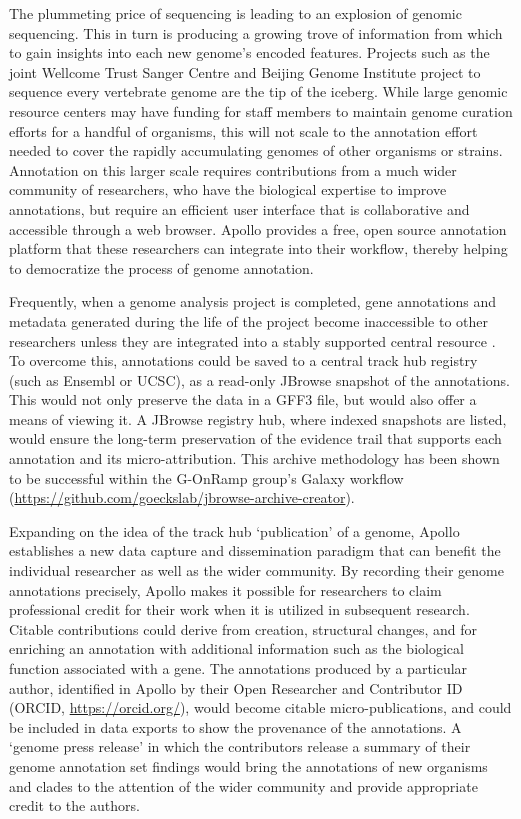 The plummeting price of sequencing is leading to an explosion of genomic
sequencing. This in turn is producing a growing trove of information
from which to gain insights into each new genome's encoded features.
Projects such as the joint Wellcome Trust Sanger Centre and Beijing
Genome Institute project to sequence every vertebrate genome \cite{Pennisi_2018}
are the tip of the iceberg. While large genomic resource centers may
have funding for staff members to maintain genome curation efforts for a
handful of organisms, this will not scale to the annotation effort
needed to cover the rapidly accumulating genomes of other organisms or
strains. Annotation on this larger scale requires contributions from a
much wider community of researchers, who have the biological expertise
to improve annotations, but require an efficient user interface that is
collaborative and accessible through a web browser. Apollo provides a
free, open source annotation platform that these researchers can
integrate into their workflow, thereby helping to democratize the
process of genome annotation.

Frequently, when a genome analysis project is completed, gene
annotations and metadata generated during the life of the project become
inaccessible to other researchers unless they are integrated into a
stably supported central resource \cite{Gibney_2013}. To overcome this,
annotations could be saved to a central track hub registry (such as
Ensembl or UCSC), as a read-only JBrowse snapshot of the annotations.
This would not only preserve the data in a GFF3 file, but would also
offer a means of viewing it. A JBrowse registry hub, where indexed
snapshots are listed, would ensure the long-term preservation of the
evidence trail that supports each annotation and its micro-attribution.
This archive methodology has been shown to be successful within the
G-OnRamp group's Galaxy workflow
(\url{https://github.com/goeckslab/jbrowse-archive-creator}).

Expanding on the idea of the track hub `publication' of a genome, Apollo
establishes a new data capture and dissemination paradigm that can
benefit the individual researcher as well as the wider community. By
recording their genome annotations precisely, Apollo makes it possible
for researchers to claim professional credit for their work when it is
utilized in subsequent research. Citable contributions could derive from
creation, structural changes, and for enriching an annotation with
additional information such as the biological function associated with a
gene. The annotations produced by a particular author, identified in
Apollo by their Open Researcher and Contributor ID (ORCID,
\url{https://orcid.org/}), would become citable micro-publications, and
could be included in data exports to show the provenance of the
annotations. A `genome press release' in which the contributors release
a summary of their genome annotation set findings would bring the
annotations of new organisms and clades to the attention of the wider
community and provide appropriate credit to the authors.

